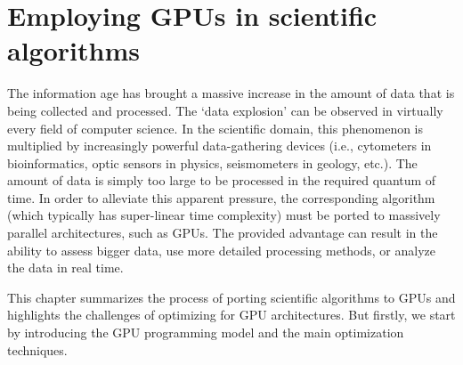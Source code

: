 \chapter{Employing GPUs in scientific algorithms}

The information age has brought a massive increase in the amount of data that is being collected and processed. The `data explosion' can be observed in virtually every field of computer science. In the scientific domain, this phenomenon is multiplied by increasingly powerful data-gathering devices (i.e., cytometers in bioinformatics, optic sensors in physics, seismometers in geology, etc.). The amount of data is simply too large to be processed in the required quantum of time. In order to alleviate this apparent pressure, the corresponding algorithm (which typically has super-linear time complexity) must be ported to massively parallel architectures, such as GPUs. The provided advantage can result in the ability to assess bigger data, use more detailed processing methods, or analyze the data in real time.

This chapter summarizes the process of porting scientific algorithms to GPUs and highlights the challenges of optimizing for GPU architectures. But firstly, we start by introducing the GPU programming model and the main optimization techniques. 







